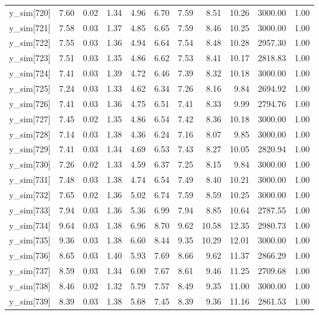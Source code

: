 \begin{table}[ht]
\begin{tabular}{rrrrrrrrrrr}
  y\_sim[720] & 7.60 & 0.02 & 1.34 & 4.96 & 6.70 & 7.59 & 8.51 & 10.26 & 3000.00 & 1.00 \\ 
  y\_sim[721] & 7.58 & 0.03 & 1.37 & 4.85 & 6.65 & 7.59 & 8.46 & 10.25 & 3000.00 & 1.00 \\ 
  y\_sim[722] & 7.55 & 0.03 & 1.36 & 4.94 & 6.64 & 7.54 & 8.48 & 10.28 & 2957.30 & 1.00 \\ 
  y\_sim[723] & 7.51 & 0.03 & 1.35 & 4.86 & 6.62 & 7.53 & 8.41 & 10.17 & 2818.83 & 1.00 \\ 
  y\_sim[724] & 7.41 & 0.03 & 1.39 & 4.72 & 6.46 & 7.39 & 8.32 & 10.18 & 3000.00 & 1.00 \\ 
  y\_sim[725] & 7.24 & 0.03 & 1.33 & 4.62 & 6.34 & 7.26 & 8.16 & 9.84 & 2694.92 & 1.00 \\ 
  y\_sim[726] & 7.41 & 0.03 & 1.36 & 4.75 & 6.51 & 7.41 & 8.33 & 9.99 & 2794.76 & 1.00 \\ 
  y\_sim[727] & 7.45 & 0.02 & 1.35 & 4.86 & 6.54 & 7.42 & 8.36 & 10.18 & 3000.00 & 1.00 \\ 
  y\_sim[728] & 7.14 & 0.03 & 1.38 & 4.36 & 6.24 & 7.16 & 8.07 & 9.85 & 3000.00 & 1.00 \\ 
  y\_sim[729] & 7.41 & 0.03 & 1.34 & 4.69 & 6.53 & 7.43 & 8.27 & 10.05 & 2820.94 & 1.00 \\ 
  y\_sim[730] & 7.26 & 0.02 & 1.33 & 4.59 & 6.37 & 7.25 & 8.15 & 9.84 & 3000.00 & 1.00 \\ 
  y\_sim[731] & 7.48 & 0.03 & 1.38 & 4.74 & 6.54 & 7.49 & 8.40 & 10.21 & 3000.00 & 1.00 \\ 
  y\_sim[732] & 7.65 & 0.02 & 1.36 & 5.02 & 6.74 & 7.59 & 8.59 & 10.25 & 3000.00 & 1.00 \\ 
  y\_sim[733] & 7.94 & 0.03 & 1.36 & 5.36 & 6.99 & 7.94 & 8.85 & 10.64 & 2787.55 & 1.00 \\ 
  y\_sim[734] & 9.64 & 0.03 & 1.38 & 6.96 & 8.70 & 9.62 & 10.58 & 12.35 & 2980.73 & 1.00 \\ 
  y\_sim[735] & 9.36 & 0.03 & 1.38 & 6.60 & 8.44 & 9.35 & 10.29 & 12.01 & 3000.00 & 1.00 \\ 
  y\_sim[736] & 8.65 & 0.03 & 1.40 & 5.93 & 7.69 & 8.66 & 9.62 & 11.37 & 2866.29 & 1.00 \\ 
  y\_sim[737] & 8.59 & 0.03 & 1.34 & 6.00 & 7.67 & 8.61 & 9.46 & 11.25 & 2709.68 & 1.00 \\ 
  y\_sim[738] & 8.46 & 0.02 & 1.32 & 5.79 & 7.57 & 8.49 & 9.35 & 11.00 & 3000.00 & 1.00 \\ 
  y\_sim[739] & 8.39 & 0.03 & 1.38 & 5.68 & 7.45 & 8.39 & 9.36 & 11.16 & 2861.53 & 1.00 \\ 

\end{tabular}
\end{table}
